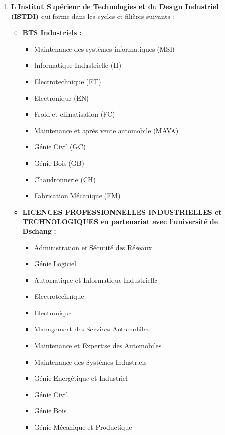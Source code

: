\begin{enumerate}
	\item \textbf{L’Institut Supérieur de Technologies et du Design Industriel (ISTDI)} qui	forme dans les cycles et filières suivants :
	
	\begin{itemize}
		\item \textbf{BTS Industriels :}
		
		\begin{itemize}
			\item Maintenance des systèmes informatiques (MSI)
			\item Informatique Industrielle (II)
			\item Electrotechnique (ET)
			\item Electronique (EN)
			\item Froid et climatisation (FC)
			\item Maintenance et après vente automobile (MAVA)
			\item Génie Civil (GC)
			\item Génie Bois (GB)
			\item Chaudronnerie (CH)
			\item Fabrication Mécanique (FM)
		\end{itemize}
		
		\item \textbf{LICENCES PROFESSIONNELLES INDUSTRIELLES et TECHNOLOGIQUES en partenariat avec l’université de Dschang :}
		
		\begin{itemize}
			\item Administration et Sécurité des Réseaux
			\item Génie Logiciel
			\item Automatique et Informatique Industrielle
			\item Electrotechnique
			\item Electronique
			\item Management des Services Automobiles
			\item Maintenance et Expertise des Automobiles
			\item Maintenance des Systèmes Industriels
			\item Génie Energétique et Industriel
			\item Génie Civil
			\item Génie Bois
			\item Génie Mécanique et Productique
		\end{itemize}
		

\end{itemize}
\end{enumerate}

